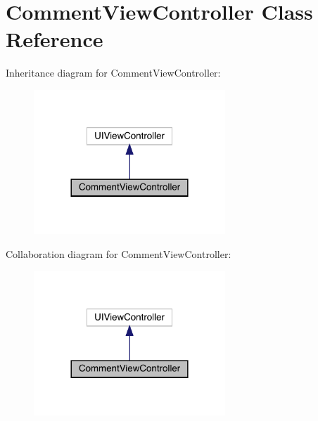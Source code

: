 \hypertarget{interface_comment_view_controller}{}\section{Comment\+View\+Controller Class Reference}
\label{interface_comment_view_controller}


Inheritance diagram for Comment\+View\+Controller\+:\nopagebreak
\begin{figure}[H]
\begin{center}
\leavevmode
\includegraphics[width=204pt]{interface_comment_view_controller__inherit__graph}
\end{center}
\end{figure}


Collaboration diagram for Comment\+View\+Controller\+:\nopagebreak
\begin{figure}[H]
\begin{center}
\leavevmode
\includegraphics[width=204pt]{interface_comment_view_controller__coll__graph}
\end{center}
\end{figure}
